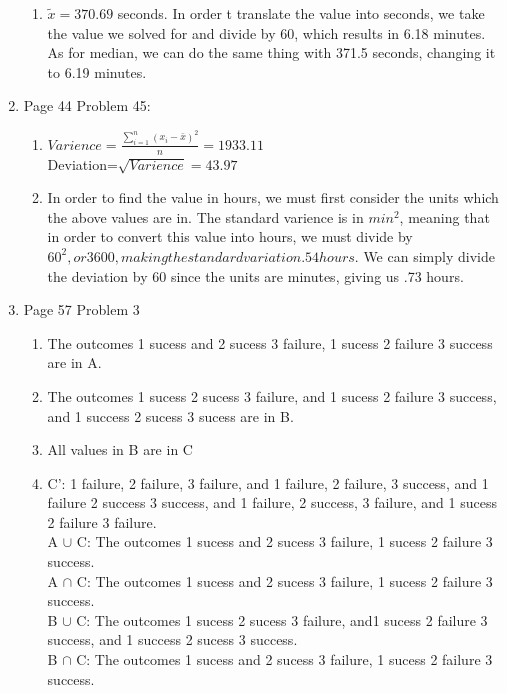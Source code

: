 \documentclass{article}
\begin{document}
\begin{enumerate}
\begin{enumerate}
\item  $\widetilde{x}=370.69$ seconds. In order t translate the value into seconds, we take the value we solved for and divide by 60, which results in 6.18 minutes. As for median, we can do the same thing with 371.5 seconds, changing it to 6.19 minutes.
\end{enumerate}
\item Page 44 Problem 45:
\begin{enumerate}
\item  $Varience=\frac{\sum\limits_{i=1}^n (x_i-\bar{x})^2}{n}=1933.11$\\
Deviation=$\sqrt{Varience}=43.97$
\item In order to find the value in hours, we must first consider the units which the above values are in. The standard varience is in $min^2$, meaning that in order to convert this value into hours, we must divide by $60^2, or 3600, making the standard variation .54 hours$. We can simply divide the deviation by 60 since the units are minutes, giving us .73 hours. 
\end{enumerate}
\item Page 57 Problem 3
\begin{enumerate}
\item The outcomes 1 sucess and 2 sucess 3 failure, 1 sucess 2 failure 3 success are in A.
\item The outcomes 1 sucess 2 sucess 3 failure, and 1 sucess 2 failure 3 success, and 1 success 2 sucess 3 sucess are in B.
\item All values in B are in C
\item C': 1 failure, 2 failure, 3 failure, and 1 failure, 2 failure, 3 success, and 1 failure 2 success 3 success, and 1 failure, 2 success, 3 failure, and 1 sucess 2 failure 3 failure. \\
  A $\cup$ C: The outcomes 1 sucess and 2 sucess 3 failure, 1 sucess 2 failure 3 success. \\
  A $\cap$ C: The outcomes 1 sucess and 2 sucess 3 failure, 1 sucess 2 failure 3 success. \\
  B $\cup$ C: The outcomes 1 sucess 2 sucess 3 failure, and1 sucess 2 failure 3 success, and 1 success 2 sucess 3 success. \\
  B $\cap$ C: The outcomes 1 sucess and 2 sucess 3 failure, 1 sucess 2 failure 3 success.

\end{enumerate}
\end{enumerate}
\end{document}
